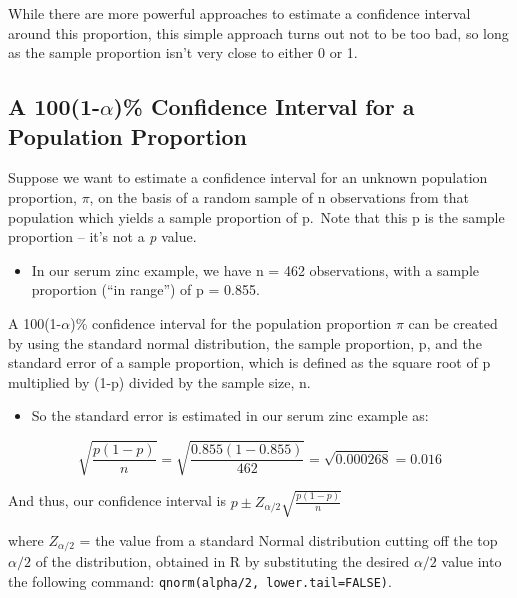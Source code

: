 \documentclass[
]{book}
\providecommand{\tightlist}{%
  \setlength{\itemsep}{0pt}\setlength{\parskip}{0pt}}
\begin{document}
While there are more powerful approaches to estimate a confidence interval around this proportion, this simple approach turns out not to be too bad, so long as the sample proportion isn't very close to either 0 or 1.

\hypertarget{a-1001-alpha-confidence-interval-for-a-population-proportion}{%
\subsection{\texorpdfstring{A 100(1-\(\alpha\))\% Confidence Interval for a Population Proportion}{A 100(1-\textbackslash alpha)\% Confidence Interval for a Population Proportion}}\label{a-1001-alpha-confidence-interval-for-a-population-proportion}}

Suppose we want to estimate a confidence interval for an unknown population proportion, \(\pi\), on the basis of a random sample of n observations from that population which yields a sample proportion of p.~Note that this p is the sample proportion -- it's not a \emph{p} value.

\begin{itemize}
\tightlist
\item
  In our serum zinc example, we have n = 462 observations, with a sample proportion (``in range'') of p = 0.855.
\end{itemize}

A 100(1-\(\alpha\))\% confidence interval for the population proportion \(\pi\) can be created by using the standard normal distribution, the sample proportion, p, and the standard error of a sample proportion, which is defined as the square root of p multiplied by (1-p) divided by the sample size, n.~

\begin{itemize}
\tightlist
\item
  So the standard error is estimated in our serum zinc example as:
\end{itemize}

\[
\sqrt{\frac{p (1-p)}{n}} = \sqrt{\frac{0.855(1-0.855)}{462}} = \sqrt{0.000268} = 0.016
\]

And thus, our confidence interval is \(p \pm Z_{\alpha/2} \sqrt{\frac{p(1-p)}{n}}\)

where \(Z_{\alpha/2}\) = the value from a standard Normal distribution cutting off the top \(\alpha/2\) of the distribution, obtained in R by substituting the desired \(\alpha/2\) value into the following command: \texttt{qnorm(alpha/2,\ lower.tail=FALSE)}.
\end{document}
